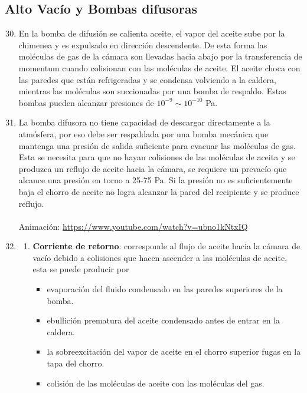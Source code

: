\subsection{Alto Vacío y Bombas difusoras}
\begin{enumerate}
\setcounter{enumi}{29}
    \item %
    En la bomba de difusión se calienta aceite, el vapor del aceite sube por la chimenea y es expulsado en dirección descendente. De esta forma las moléculas de gas de la cámara son llevadas hacia abajo por la transferencia de momentum cuando colisionan con las moléculas de aceite. El aceite choca con las paredes que están refrigeradas y se condensa volviendo a la caldera, mientras las moléculas son succionadas por una bomba de respaldo. Estas bombas pueden alcanzar presiones de $\mathrm{10^{-9}} \sim \mathrm{10^{-10}}$ Pa.
    
    \item %
    La bomba difusora no tiene capacidad de descargar directamente a la atmósfera, por eso debe ser respaldada por una bomba mecánica que mantenga una presión de salida suficiente para evacuar las moléculas de gas. Esta se necesita para que no hayan colisiones de las moléculas de aceita y se produzca un reflujo de aceite hacia la cámara, se requiere un prevacío que alcance una presión en torno a 25-75 Pa. Si la presión no es suficientemente baja el chorro de aceite no logra alcanzar la pared del recipiente y se produce reflujo. \\ \\
    Animación: \url{https://www.youtube.com/watch?v=ubno1kNtxIQ}
    
    \item %
    \begin{enumerate}
        \item %
        \textbf{Corriente de retorno}: corresponde al flujo de aceite hacia la cámara de vacío debido a colisiones que hacen ascender a las moléculas de aceite, esta se puede producir por 
        \begin{itemize}
            \item evaporación del fluido condensado en las paredes superiores de la bomba.
            \item ebullición prematura del aceite condensado antes de entrar en la caldera.
            \item la sobreexcitación del vapor de aceite en el chorro superior  fugas en la tapa del chorro.
            \item colisión de las moléculas de aceite con las moléculas del gas.
        \end{itemize}
        

\end{enumerate}
\end{enumerate}
